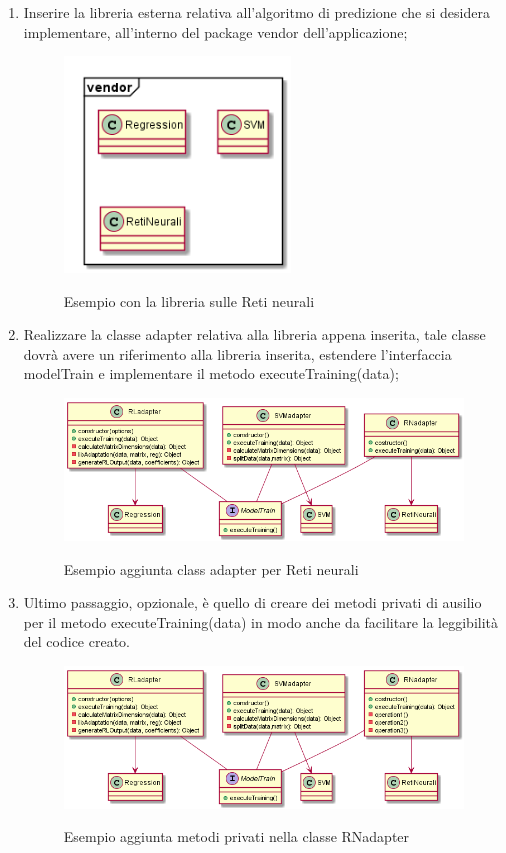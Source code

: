 \documentclass[../manuale-sviluppatore.tex]{subfiles}
\begin{document}
\begin{enumerate}
  \item Inserire la libreria esterna relativa all'algoritmo di predizione che si desidera implementare, all'interno del package vendor dell'applicazione;
            \begin{figure}[H]
              \centering
              \includegraphics[width=6cm]{img/packagesRetiNeurali.png}
              \label{fig:scice_documenti}
              \caption{Esempio con la libreria sulle Reti neurali}
            \end{figure}
  \item Realizzare la classe adapter relativa alla libreria appena inserita, tale classe dovrà avere un riferimento alla libreria inserita, estendere l'interfaccia modelTrain e implementare il metodo executeTraining(data);
            \begin{figure}[H]
              \centering
              \includegraphics[width=14cm]{img/classDiagramRN.png}
              \label{fig:scice_documenti}
              \caption{Esempio aggiunta class adapter per Reti neurali}
            \end{figure}
  \item Ultimo passaggio, opzionale, è quello di creare dei metodi privati di ausilio per il metodo executeTraining(data) in modo anche da facilitare la leggibilità del codice creato.
            \begin{figure}[H]
              \centering
              \includegraphics[width=14cm]{img/classDiagramRNoperation.png}
              \label{fig:scice_documenti}
              \caption{Esempio aggiunta metodi privati nella classe RNadapter}
            \end{figure}
\end{enumerate}
\end{document}
